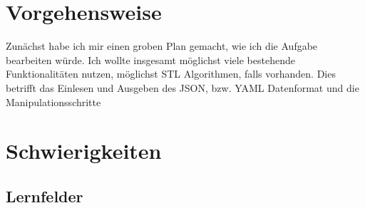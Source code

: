 \documentclass[11pt]{article}
\theoremstyle{definition}
\begin{document}
\section{Vorgehensweise}
\label{Vorgehensweise}
Zunächst habe ich mir einen groben Plan gemacht, wie ich die Aufgabe bearbeiten würde.
Ich wollte insgesamt möglichst viele bestehende Funktionalitäten nutzen, möglichst STL Algorithmen, falls vorhanden. Dies betrifft das Einlesen und Ausgeben des JSON, bzw. YAML Datenformat und die Manipulationsschritte


\section{Schwierigkeiten}
\subsection{Lernfelder}
\end{document}
